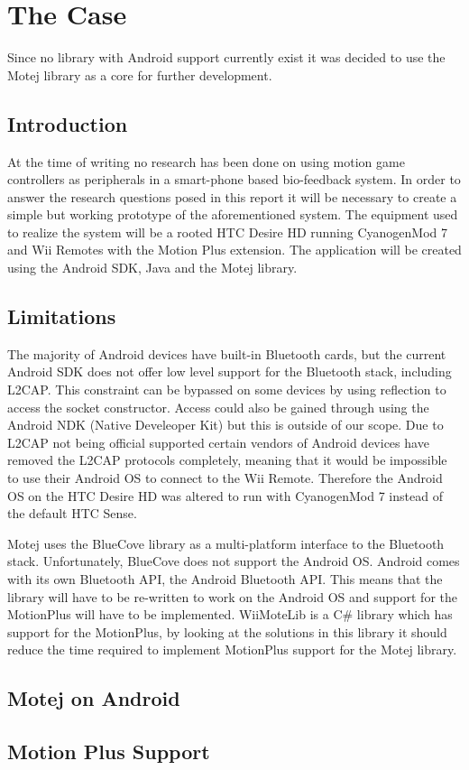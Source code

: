 \documentclass[11pt,twoside,a4paper]{report}
\begin{document}
\chapter{The Case}
Since no library with Android support currently exist it was decided to use the Motej library as a core for further development.

\section{Introduction}
At the time of writing no research has been done on using motion game controllers as peripherals in a smart-phone based bio-feedback system. In order to answer the research questions posed in this report it will be necessary to create a simple but working prototype of the aforementioned system. The equipment used to realize the system will be a rooted HTC Desire HD \cite{desireHdSpecs} running CyanogenMod 7 \cite{cyanogenMod} and Wii Remotes with the Motion Plus extension. The application will be created using the Android SDK, Java and the Motej library.


\section{Limitations}
The majority of Android devices have built-in Bluetooth cards, but the current Android SDK does not offer low level support for the Bluetooth stack, including L2CAP. This constraint can be bypassed on some devices by using reflection to access the socket constructor\cite{l2capHtc}. Access could also be gained through using the Android NDK (Native Develeoper Kit) but this is outside of our scope. Due to L2CAP not being official supported certain vendors of Android devices have removed the L2CAP protocols completely, meaning that it would be impossible to use their Android OS to connect to the Wii Remote. Therefore the Android OS on the HTC Desire HD was altered to run with CyanogenMod 7 instead of the default HTC Sense.

Motej uses the BlueCove library as a multi-platform interface to the Bluetooth stack. Unfortunately, BlueCove does not support the Android OS. Android comes with its own Bluetooth API, the Android Bluetooth API. This means that the library will have to be re-written to work on the Android OS and support for the MotionPlus will have to be implemented. WiiMoteLib\cite{wiiMoteLib} is a C\# library which has support for the MotionPlus, by looking at the solutions in this library it should reduce the time required to implement MotionPlus support for the Motej library.

\section{Motej on Android}

\section{Motion Plus Support}





\end{document}
